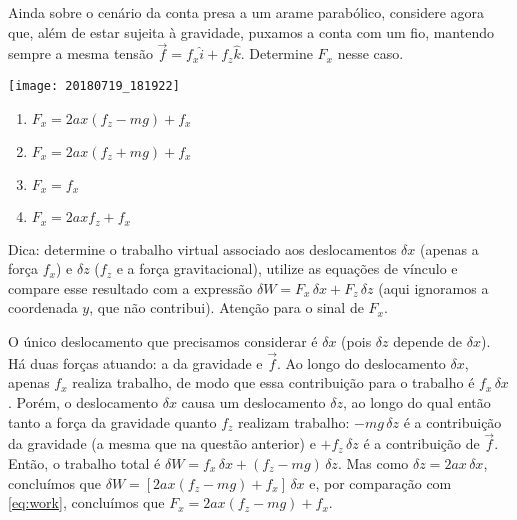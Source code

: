 \begin{question}\label{q:Fx}
    Ainda sobre o cenário da conta presa a um arame parabólico, considere agora que, além de estar sujeita à gravidade, puxamos a conta com um fio, mantendo sempre a mesma tensão $\vec f = f_x\hat i + f_z\hat k$.
    Determine $F_x$ nesse caso.

    \begin{center}
      \texttt{[image: 20180719\_181922]}
    \end{center}

    \begin{enumerate}
      \item $F_x = 2ax(f_z - mg) + f_x$ \rightanswer
      \item $F_x = 2ax(f_z + mg) + f_x$
      \item $F_x = f_x$
      \item $F_x = 2axf_z + f_x$
    \end{enumerate}
    
    \bigskip
    \begin{compactdesc}
      \item[Dica:] determine o trabalho virtual associado aos deslocamentos $\delta x$ (apenas a força $f_x$) e $\delta z$ ($f_z$ e a força gravitacional), utilize as equações de vínculo e compare esse resultado com a expressão $\delta W = F_x\,\delta x + F_z\,\delta z$ (aqui ignoramos a coordenada $y$, que não contribui).
      Atenção para o sinal de $F_x$.
    \end{compactdesc}

    \begin{solution}
      O único deslocamento que precisamos considerar é $\delta x$ (pois $\delta z$ depende de $\delta x$).
      Há duas forças atuando: a da gravidade e $\vec f$.
      Ao longo do deslocamento $\delta x$, apenas $f_x$ realiza trabalho, de modo que essa contribuição para o trabalho é $f_x\,\delta x$.
      Porém, o deslocamento $\delta x$ causa um deslocamento $\delta z$, ao longo do qual então tanto a força da gravidade quanto $f_z$ realizam trabalho: $-mg\,\delta z$ é a contribuição da gravidade (a mesma que na questão anterior) e $+f_z\,\delta z$ é a contribuição de $\vec f$.
      Então, o trabalho total é $\delta W = f_x\,\delta x + (f_z - mg)\,\delta z$.
      Mas como $\delta z = 2ax\,\delta x$, concluímos que $\delta W = \left[2ax(f_z - mg) + f_x\right]\,\delta x$ e, por comparação com \eqref{eq:work}, concluímos que $F_x = 2ax(f_z - mg) + f_x$.
    \end{solution}
\end{question}